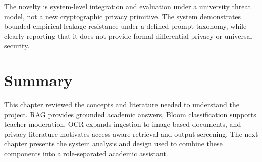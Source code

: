 The novelty is system-level integration and evaluation under a university threat model, not a new cryptographic privacy primitive. The system demonstrates bounded empirical leakage resistance under a defined prompt taxonomy, while clearly reporting that it does not provide formal differential privacy or universal security.

\section{Summary}

This chapter reviewed the concepts and literature needed to understand the project. RAG provides grounded academic answers, Bloom classification supports teacher moderation, OCR expands ingestion to image-based documents, and privacy literature motivates access-aware retrieval and output screening. The next chapter presents the system analysis and design used to combine these components into a role-separated academic assistant.
